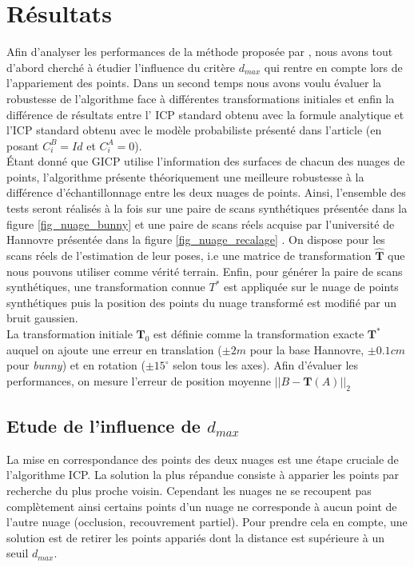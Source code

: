 \section{Résultats}
Afin d'analyser les performances de la méthode proposée par \cite{bib_gicp}, nous avons tout d'abord cherché à étudier l'influence du critère $d_{max}$ qui rentre en compte lors de l'appariement des points. Dans un second temps nous avons voulu évaluer la robustesse de l'algorithme face à différentes transformations initiales et enfin la différence de résultats entre l' ICP standard obtenu avec la formule analytique et l'ICP standard obtenu avec le modèle probabiliste présenté dans l'article (en posant $C_{i}^B=Id$ et $C_{i}^A=0$).\\

Étant donné que GICP utilise l'information des surfaces de chacun des nuages de points, l'algorithme présente théoriquement une meilleure robustesse à la différence d'échantillonnage entre les deux nuages de points. Ainsi, l'ensemble des tests seront réalisés à la fois sur une paire de scans synthétiques présentée dans la figure \ref{fig_nuage_bunny} et une paire de scans réels acquise par l'université de Hannovre présentée dans la figure \ref{fig_nuage_recalage} . On dispose pour les scans réels de l'estimation de leur poses, i.e une matrice de transformation $\hat{\mathbf{T}}$ que nous pouvons utiliser comme vérité terrain. Enfin, pour générer la paire de scans synthétiques, une transformation connue $T^{*}$ est appliquée sur le nuage de points synthétiques puis la position des points du nuage transformé est modifié par un bruit gaussien.\\

La transformation initiale $\mathbf{T}_0$ est définie comme la transformation exacte $\mathbf{T}^*$ auquel on ajoute une erreur en translation ($\pm2m$ pour la base Hannovre, $\pm0.1cm$ pour \textit{bunny}) et en rotation ($\pm15^{\circ}$ selon tous les axes). Afin d'évaluer les performances, on mesure l'erreur de position moyenne $||B - \mathbf{T}(A)||_2$ %
\subsection{Etude de l'influence de $d_{max}$}
\label{part:influencedmax}
La mise en correspondance des points des deux nuages est une étape cruciale de l'algorithme ICP. La solution la plus répandue consiste à apparier les points par recherche du plus proche voisin. Cependant les nuages ne se recoupent pas complètement ainsi certains points d'un nuage ne corresponde à aucun point de l'autre nuage (occlusion, recouvrement partiel). Pour prendre cela en compte, une solution est de retirer les points appariés dont la distance est supérieure à un seuil $d_{max}$.\\

